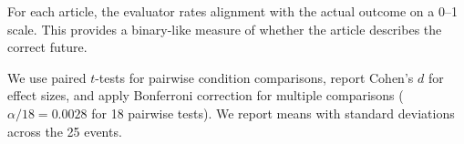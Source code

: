  For each article, the evaluator rates alignment with the actual outcome on a 0--1 scale. This provides a binary-like measure of whether the article describes the correct future.

 We use paired $t$-tests for pairwise condition comparisons, report Cohen's $d$ for effect sizes, and apply Bonferroni correction for multiple comparisons ($\alpha / 18 = 0.0028$ for 18 pairwise tests). We report means with standard deviations across the 25 events.
